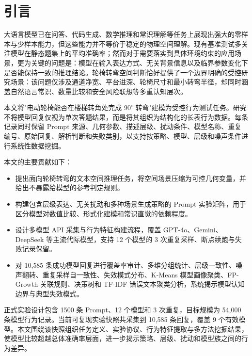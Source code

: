 \section{引言}

大语言模型已在问答、代码生成、数学推理和常识理解等任务上展现出强大的零样本与少样本能力\cite{brown2020language,bommasani2021opportunities}，但这些能力并不等价于稳定的物理空间理解。现有基准测试多关注模型在静态题集上的平均准确率\cite{hendrycks2021measuring,srivastava2022beyond,liang2022holistic}；然而对于需要落实到具体环境约束的应用场景，更为关键的问题是：模型在输入表达方式、无关背景信息以及临界参数变化下是否能保持一致的推理结论。轮椅转弯空间判断恰好提供了一个边界明确的受控研究场景：该问题仅涉及通道净宽、平台进深、轮椅尺寸和最小转弯半径，却同时涵盖自然语言常识、数量比较和安全风险联想等多重认知层次\cite{mirzaee2021spartqa,comsa-narayanan-2023-benchmark}。

本文将"电动轮椅能否在楼梯转角处完成 $90^\circ$ 转弯"建模为受控行为测试任务。研究不将模型回复仅视为单次答题结果，而是将其组织为结构化的长表行为数据。每条记录同时保留 Prompt 来源、几何参数、描述层级、扰动条件、模型名称、重复编号、原始回复、解析判断和失败类别，以支持按策略、模型、层级和噪声条件进行系统性数据挖掘。

本文的主要贡献如下：
\begin{itemize}
  \item 提出面向轮椅转弯的文本空间推理任务，将空间场景压缩为可控几何变量，并给出不暴露给模型的参考判定规则。
  \item 构建包含层级表达、无关扰动和多种场景生成策略的 Prompt 实验矩阵，用于区分模型对数值比较、形式化建模和常识直觉的依赖程度。
  \item 设计多模型 API 采集与行为特征构建流程，覆盖 GPT-4o\cite{openai2023gpt4}、Gemini\cite{gemini2023}、DeepSeek\cite{deepseekv2_2024} 等主流代际模型，支持 12 个模型的 3 次重复采样、断点续跑与失败记录保留。
  \item 对 10{,}585 条成功模型回复进行覆盖率审计、多维分组统计、层级一致性、噪声翻转、重复采样自一致性、失效模式分布、K-Means 模型画像聚类、FP-Growth 关联规则、决策树和 TF-IDF 错误文本聚类分析，系统揭示模型认知边界与典型失效模式。
\end{itemize}

正式实验设计包含 1500 条 Prompt、12 个模型和 3 次重复，目标规模为 54{,}000 条模型行为记录。当前可复现实验快照共采集到 10{,}585 条回复，覆盖 9 个有效模型。本文围绕该快照组织任务定义、实验协议、行为特征提取与多方法挖掘结果，使模型比较超越总体准确率层面，进一步揭示策略、层级、扰动和模型族之间的行为差异。
